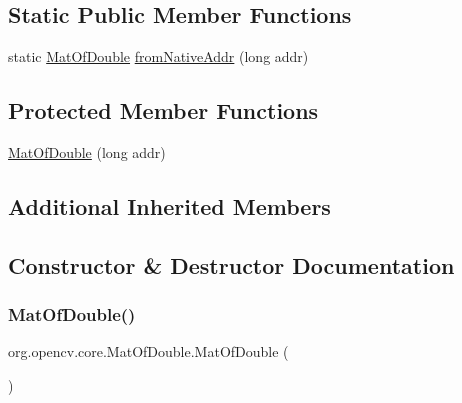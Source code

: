 \subsection*{Static Public Member Functions}
\begin{DoxyCompactItemize}
\item 
static \mbox{\hyperlink{classorg_1_1opencv_1_1core_1_1_mat_of_double}{Mat\+Of\+Double}} \mbox{\hyperlink{classorg_1_1opencv_1_1core_1_1_mat_of_double_abf90202adf487b061326dd519fd664b8}{from\+Native\+Addr}} (long addr)
\end{DoxyCompactItemize}
\subsection*{Protected Member Functions}
\begin{DoxyCompactItemize}
\item 
\mbox{\hyperlink{classorg_1_1opencv_1_1core_1_1_mat_of_double_a607e129233cb6db904ef12876decac1f}{Mat\+Of\+Double}} (long addr)
\end{DoxyCompactItemize}
\subsection*{Additional Inherited Members}


\subsection{Constructor \& Destructor Documentation}
\mbox{\label{classorg_1_1opencv_1_1core_1_1_mat_of_double_a46c61382d84cd3f0e7740f3bb8975e15}} 
\subsubsection{\texorpdfstring{Mat\+Of\+Double()}{MatOfDouble()}\hspace{0.1cm}{\footnotesize\ttfamily [1/4]}}
{\footnotesize\ttfamily org.\+opencv.\+core.\+Mat\+Of\+Double.\+Mat\+Of\+Double (\begin{DoxyParamCaption}{ }\end{DoxyParamCaption})}

\mbox{\label{classorg_1_1opencv_1_1core_1_1_mat_of_double_a607e129233cb6db904ef12876decac1f}} 
